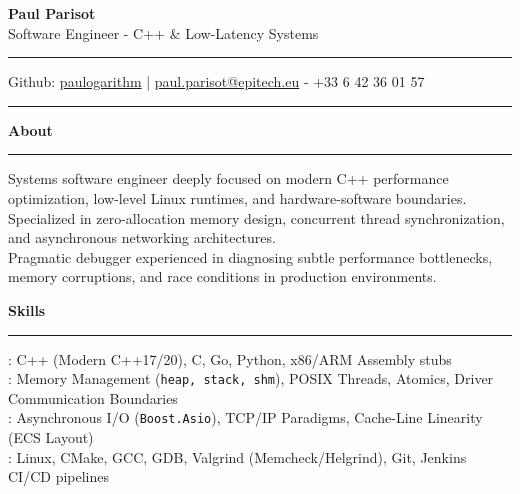 \documentclass[9pt]{extarticle}
\begin{document}
\begin{center}
    {\huge\bfseries Paul Parisot} %
    \\[10pt]
    {\Large Software Engineer - C++ \& Low-Latency Systems}
    \\
\end{center}

\par\vspace{-10pt}
\rule{\linewidth}{0.4pt}
\par\vspace{-10pt}

\begin{center}
    Github: \href{https://github.com/paulogarithm}{paulogarithm} %
    \quad | \quad 
    \href{mailto:paul.parisot@epitech.eu}{paul.parisot@epitech.eu} - +33 6 42 36 01 57 %
\end{center}

\par\vspace{-15pt}
\rule{\linewidth}{0.4pt}
\par\vspace{5pt}

{\large\bfseries About}
\par\vspace{-8pt}
\rule{\linewidth}{0.4pt}
\par\vspace{5pt}

Systems software engineer deeply focused on modern C++ performance optimization, low-level Linux runtimes, and hardware-software boundaries. \\
Specialized in zero-allocation memory design, concurrent thread synchronization, and asynchronous networking architectures. \\
Pragmatic debugger experienced in diagnosing subtle performance bottlenecks, memory corruptions, and race conditions in production environments.

\par\vspace{5pt}

{\large\bfseries Skills}
\par\vspace{-8pt}
\rule{\linewidth}{0.4pt}
\par\vspace{5pt}

\hspace*{5pt}{\bfseries Core Systems}: C++ (Modern C++17/20), C, Go, Python, x86/ARM Assembly stubs \\
\hspace*{5pt}{\bfseries Low-Level Linux}: Memory Management (\texttt{heap, stack, shm}), POSIX Threads, Atomics, Driver Communication Boundaries \\
\hspace*{5pt}{\bfseries Performance \& Networking}: Asynchronous I/O (\texttt{Boost.Asio}), TCP/IP Paradigms, Cache-Line Linearity (ECS Layout) \\
\hspace*{5pt}{\bfseries Engineering Toolchain}: Linux, CMake, GCC, GDB, Valgrind (Memcheck/Helgrind), Git, Jenkins CI/CD pipelines
\end{document}
